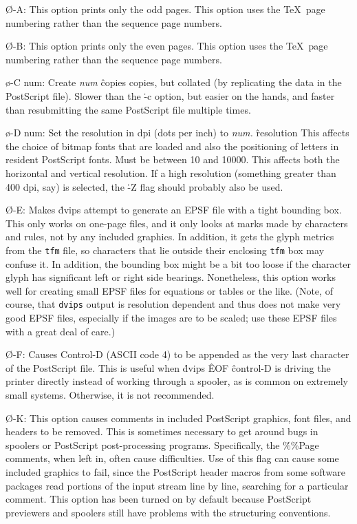 {\O-A:
This option prints only the odd pages.  This option uses the \TeX\
page numbering rather than the sequence page numbers.

\O-B:
This option prints only the even pages.  This option uses the \TeX\
page numbering rather than the sequence page numbers.

\o-C num:
Create {\it num}
\^{copies}
copies, but collated (by replicating the data in the PostScript file).
Slower than the \.{-c} option, but easier on the hands, and faster than
resubmitting the same PostScript file multiple times.

\o-D num:
Set the resolution in dpi (dots per inch) to {\it num.}
\^{resolution}
This affects the choice of bitmap fonts that are loaded and also the positioning
of letters in resident PostScript fonts. Must be between 10 and 10000.
This affects both the horizontal and vertical resolution.  If a high resolution
(something greater than 400 dpi, say) is selected, the \.{-Z} flag should
probably also be used.

\O-E:
Makes \.{dvips} attempt to generate an EPSF file with a tight bounding
box.  This only works on one-page files, and it only looks at marks made
by characters and rules, not by any included graphics.  In addition, it
gets the glyph metrics from the {\tt tfm} file, so characters that
lie outside their enclosing {\tt tfm} box may confuse it.  In addition,
the bounding box might be a bit too loose if the character glyph has
significant left or right side bearings.  Nonetheless, this option works
well for creating small EPSF files for equations or tables or the like.
(Note, of course, that {\tt dvips} output is resolution dependent and
thus does not make very good EPSF files, especially if the images are
to be scaled; use these EPSF files with a great deal of care.)

\O-F:
Causes Control-D (ASCII code 4) to be appended as the very last character
of the PostScript file.  This is useful when \.{dvips}
\^{EOF}
\^{control-D}
is driving the printer directly instead of working through a spooler,
as is common on extremely small systems.  Otherwise, it is not recommended.

\O-K:
This option causes comments in included PostScript graphics, font files,
and headers to be removed.  This is sometimes necessary to get around bugs
in spoolers or PostScript post-processing programs.  Specifically, the
\.{\%\%Page} comments, when left in, often cause difficulties.
Use of this flag can cause some included graphics to fail, since the
PostScript header macros from some software packages read portions of
the input stream line by line, searching for a particular comment.
This option has been turned on by default because PostScript previewers
and spoolers still have problems with the structuring conventions.

}

